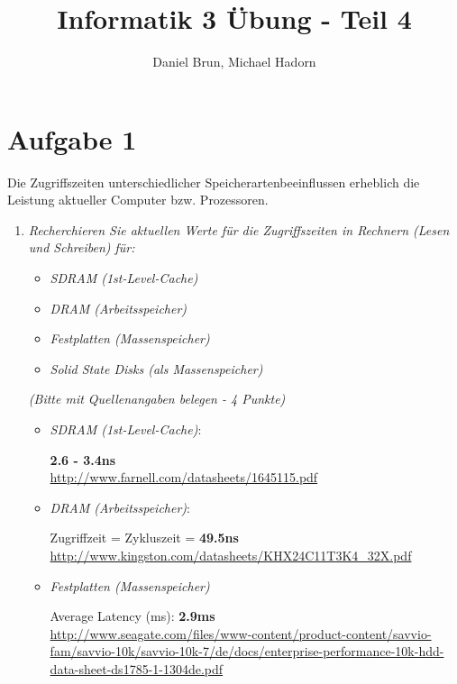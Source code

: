 \documentclass[10pt]{article}
\title{Informatik 3 Übung - Teil 4\vspace{-2ex}}
\author{Daniel Brun, Michael Hadorn\vspace{-2ex}}
\begin{document}
\maketitle

\section*{Aufgabe 1}
Die Zugriffszeiten unterschiedlicher Speicherartenbeeinflussen erheblich die Leistung aktueller Computer bzw. Prozessoren.
\begin{enumerate}[label=\alph*)]
	\item
		\textit{Recherchieren Sie aktuellen Werte für die Zugriffszeiten in Rechnern (Lesen und Schreiben) für:}
		\begin{itemize}
			\item \textit{SDRAM (1st-Level-Cache)}
			\item \textit{DRAM (Arbeitsspeicher)}
			\item \textit{Festplatten (Massenspeicher)}
			\item \textit{Solid State Disks (als Massenspeicher)}
		\end{itemize}
		\textit{(Bitte mit Quellenangaben belegen - 4 Punkte)}
		
		\begin{itemize}
			\item \textit{SDRAM (1st-Level-Cache)}:
			
			\textbf{2.6 - 3.4ns}\\
			\url{http://www.farnell.com/datasheets/1645115.pdf}
			
			
			\item \textit{DRAM (Arbeitsspeicher)}:

			Zugriffzeit = Zykluszeit = \textbf{49.5ns}\\
			\url{http://www.kingston.com/datasheets/KHX24C11T3K4_32X.pdf}
			
			
			\item \textit{Festplatten (Massenspeicher)}
			
			Average Latency (ms): \textbf{2.9ms}\\
			
			\url{http://www.seagate.com/files/www-content/product-content/savvio-fam/savvio-10k/savvio-10k-7/de/docs/enterprise-performance-10k-hdd-data-sheet-ds1785-1-1304de.pdf}\\
			

\end{itemize}
\end{enumerate}
\end{document}
